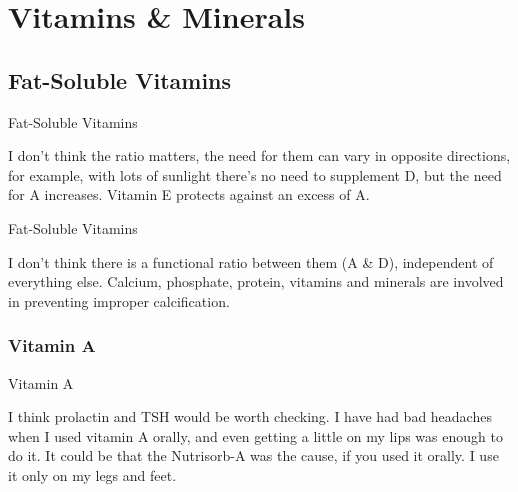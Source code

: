 \documentclass[11pt,oneside,openany,extrafontsizes]{memoir}
\begin{document}
\chapter{Vitamins \& Minerals}

\section{Fat-Soluble Vitamins}

\begin{standalonequote}{Fat-Soluble Vitamins}

    \begin{answer}
      I don't think the ratio matters, the need for them can vary in opposite directions, for example, with lots of sunlight there's no need to supplement D, but the need for A increases. Vitamin E protects against an excess of A.
    \end{answer}
\end{standalonequote}

\begin{standalonequote}{Fat-Soluble Vitamins}

    \begin{answer}
      I don't think there is a functional ratio between them (A \& D), independent of everything else. Calcium, phosphate, protein, vitamins and minerals are involved in preventing improper calcification.
    \end{answer}
\end{standalonequote}

\subsection{Vitamin A}

\begin{standalonequote}{Vitamin A}

    \begin{answer}
        I think prolactin and TSH would be worth checking. I have had bad headaches when I used vitamin A orally, and even getting a little on my lips was enough to do it. It could be that the Nutrisorb-A was the cause, if you used it orally. I use it only on my legs and feet.
    \end{answer}
\end{standalonequote}
\end{document}
